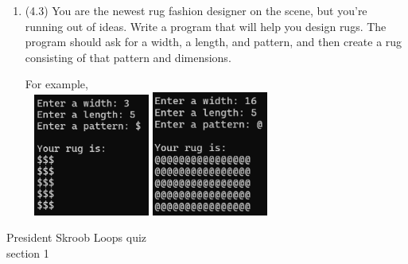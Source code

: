 \documentclass{article}
\begin{document}
\begin{enumerate}
\item (4.3)  
		You are the newest rug fashion designer on the scene, but you're running out of ideas. 
		Write a program that will help you design rugs.  The program should ask for a width, 
		a length, and pattern, and then create a rug consisting of that pattern and dimensions.

		For example, \\ \ \hfill
		\includegraphics[width = 1.5in]{./imgs/rug1.PNG} \hfill  
		\includegraphics[width = 1.5in]{./imgs/rug2.PNG} \hfill \


\end{enumerate}
\pagebreak
President Skroob \hfill Loops quiz\\
section 1\\
\end{document}
